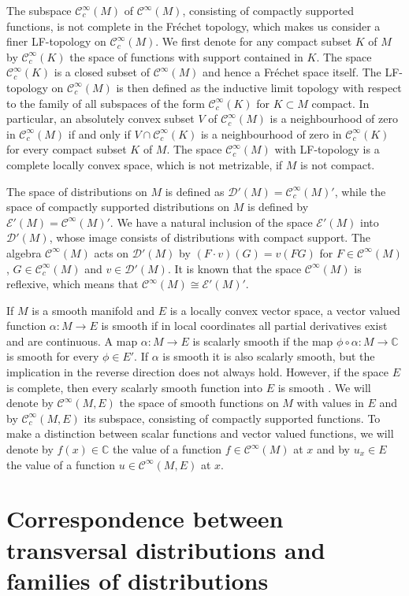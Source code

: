 \documentclass[a4paper]{amsart}
\newcommand{\CC}{\mathbb{C}}
\newcommand{\cD}{\mathcal{D}}
\newcommand{\cE}{\mathcal{E}}
\newcommand{\C}{\mathord{\mathcal{C}^{\infty}}}
\newcommand{\Cc}{\mathord{\mathcal{C}^{\infty}_{c}}}
\begin{document}
The subspace $\Cc(M)$ of $\C(M)$, consisting of compactly supported
functions, is not complete in the Fr\'{e}chet topology, which makes us consider a finer LF-topology on $\Cc(M)$. 
We first denote for any compact subset $K$ of $M$ by $\Cc(K)$ the space of functions with
support contained in $K$. The space $\Cc(K)$ is a closed subset of $\C(M)$ and hence a Fr\'{e}chet space itself.
The LF-topology on $\Cc(M)$ is then defined as the inductive limit topology with respect to the family of all subspaces
of the form $\Cc(K)$ for $K\subset M$ compact. In particular, an absolutely convex subset $V$ of $\Cc(M)$ is
a neighbourhood of zero in $\Cc(M)$ if and only if $V\cap\Cc(K)$ is a neighbourhood of zero in $\Cc(K)$ for every compact subset
$K$ of $M$. The space 
$\Cc(M)$ with LF-topology is a complete locally convex space, which is not metrizable, if $M$ is not compact.

The space of distributions on $M$ is defined as $\cD'(M)=\Cc(M)'$, while the space of compactly supported
distributions on $M$ is defined by $\cE'(M)=\C(M)'$. We have a natural inclusion of the space $\cE'(M)$
into $\cD'(M)$, whose image consists of distributions with compact support. The algebra $\C(M)$ acts
on $\cD'(M)$ by $(F\cdot v)(G)=v(FG)$ for $F\in\C(M)$, $G\in\Cc(M)$ and $v\in\cD'(M)$.
It is known that the space $\C(M)$ is reflexive, which
means that $\C(M)\cong\cE'(M)'$.

If $M$ is a smooth manifold and $E$ is a locally convex vector space,
a vector valued function $\alpha:M\to E$ is smooth if in local coordinates all partial derivatives exist
and are continuous. A map $\alpha:M\to E$ is scalarly smooth if the map $\phi\circ\alpha:M\to\CC$ is smooth for every $\phi\in E'$. If $\alpha$
is smooth it is also scalarly smooth, but the implication in the reverse direction does not always hold. However, 
if the space $E$ is complete, then every scalarly smooth function into $E$ is smooth \cite{KrMi97}.
We will denote by $\C(M,E)$ the space of smooth functions on $M$ with values in $E$ and by
$\Cc(M,E)$ its subspace, consisting of compactly supported functions. To make a distinction between scalar functions and vector valued functions, 
we will denote by $f(x)\in\CC$ the value of a function $f\in\C(M)$ at $x$ and by $u_{x}\in E$ the value of a function $u\in\C(M,E)$ at $x$. 



\section{Correspondence between transversal distributions and families of distributions}
\end{document}
